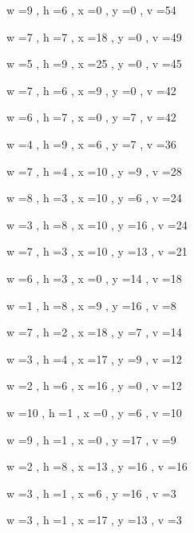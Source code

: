\documentclass[11pt]{article}
\begin{document}
w =9 , h =6 , x =0 , y =0 , v =54
\par
w =7 , h =7 , x =18 , y =0 , v =49
\par
w =5 , h =9 , x =25 , y =0 , v =45
\par
w =7 , h =6 , x =9 , y =0 , v =42
\par
w =6 , h =7 , x =0 , y =7 , v =42
\par
w =4 , h =9 , x =6 , y =7 , v =36
\par
w =7 , h =4 , x =10 , y =9 , v =28
\par
w =8 , h =3 , x =10 , y =6 , v =24
\par
w =3 , h =8 , x =10 , y =16 , v =24
\par
w =7 , h =3 , x =10 , y =13 , v =21
\par
w =6 , h =3 , x =0 , y =14 , v =18
\par
w =1 , h =8 , x =9 , y =16 , v =8
\par
w =7 , h =2 , x =18 , y =7 , v =14
\par
w =3 , h =4 , x =17 , y =9 , v =12
\par
w =2 , h =6 , x =16 , y =0 , v =12
\par
w =10 , h =1 , x =0 , y =6 , v =10
\par
w =9 , h =1 , x =0 , y =17 , v =9
\par
w =2 , h =8 , x =13 , y =16 , v =16
\par
w =3 , h =1 , x =6 , y =16 , v =3
\par
w =3 , h =1 , x =17 , y =13 , v =3
\par
\newpage
\end{document}
